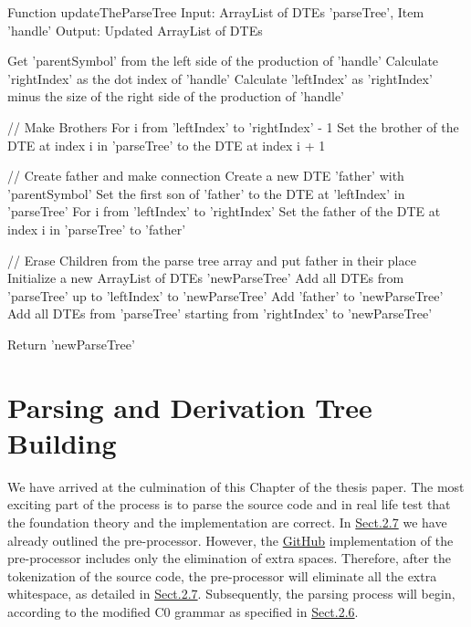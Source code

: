 \begin{codeblock}
    Function updateTheParseTree
    Input: ArrayList of DTEs 'parseTree', Item 'handle'
    Output: Updated ArrayList of DTEs

    Get 'parentSymbol' from the left side of the production of 'handle'
    Calculate 'rightIndex' as the dot index of 'handle'
    Calculate 'leftIndex' as 'rightIndex' minus the size of the right side of the production of 'handle'

    // Make Brothers
    For i from 'leftIndex' to 'rightIndex' - 1
    Set the brother of the DTE at index i in 'parseTree' to the DTE at index i + 1

    // Create father and make connection
    Create a new DTE 'father' with 'parentSymbol'
    Set the first son of 'father' to the DTE at 'leftIndex' in 'parseTree'
    For i from 'leftIndex' to 'rightIndex'
    Set the father of the DTE at index i in 'parseTree' to 'father'

    // Erase Children from the parse tree array and put father in their place
    Initialize a new ArrayList of DTEs 'newParseTree'
    Add all DTEs from 'parseTree' up to 'leftIndex' to 'newParseTree'
    Add 'father' to 'newParseTree'
    Add all DTEs from 'parseTree' starting from 'rightIndex' to 'newParseTree'

    Return 'newParseTree'
\end{codeblock}

\newpage


\section{Parsing and Derivation Tree Building}\label{sec:Parsing and Derivation Tree Building}

We have arrived at the culmination of this Chapter of the thesis paper. The most exciting part of the process is to parse the source code and in real life test that the foundation theory and the implementation are correct. In \hyperref[sec:Pre-processing for C0 Source Code]{Sect.2.7} we have already outlined the pre-processor. However, the \href{https://github.com/fyfsb/dcfg/}{GitHub} implementation of the pre-processor includes only the elimination of extra spaces. Therefore, after the tokenization of the source code, the pre-processor will eliminate all the extra whitespace, as detailed in \hyperref[sec:Pre-processing for C0 Source Code]{Sect.2.7}. Subsequently, the parsing process will begin, according to the modified C0 grammar as specified in \hyperref[sec:Analysis and Corrections of C0 Grammar based on DK1 Test]{Sect.2.6}.  \\

